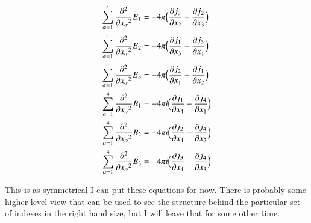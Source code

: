 \documentclass{article}      %
\newcommand{\delambert}[0]{\sum_{\alpha = 1}^4{\Dsq{x_\alpha}{}}}
\newcommand{\D}[2] {\frac {\partial #2} {\partial #1}}
\newcommand{\Dsq}[2] {\frac {\partial^2 #2} {\partial {#1}^2}}
\begin{document}
\begin{align*}
\delambert E_1 &= -4\pi \Bigl(\D{x_2}{j_3} - \D{x_3}{j_2} \Bigr) \\
\delambert E_2 &= -4\pi \Bigl(\D{x_3}{j_1} - \D{x_1}{j_3} \Bigr) \\
\delambert E_3 &= -4\pi \Bigl(\D{x_1}{j_2} - \D{x_2}{j_1} \Bigr) \\
\delambert B_1 &= -4\pi i \Bigl(\D{x_4}{j_1} - \D{x_1}{j_4} \Bigr)\\
\delambert B_2 &= -4\pi i \Bigl(\D{x_4}{j_2} - \D{x_2}{j_4} \Bigr)\\
\delambert B_3 &= -4\pi i \Bigl(\D{x_4}{j_3} - \D{x_3}{j_4} \Bigr)
\end{align*}

This is as symmetrical I can put these equations for now.  There is probably some higher level 
view that can be used to see the structure behind the particular set of indexes in the right 
hand size, but I will leave that for some other time.
\end{document}
